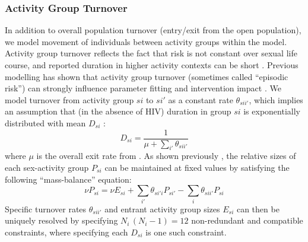 \subsubsection{Activity Group Turnover}\label{mod.par.turn.act}
In addition to overall population turnover (entry/exit from the open population),
we model movement of individuals between activity groups within the model.
Activity group turnover reflects the fact that risk is not constant over sexual life course,
and reported duration in higher activity contexts can be short \cite{Scorgie2012}.
Previous modelling has shown that activity group turnover (sometimes called ``episodic risk'')
can strongly influence parameter fitting and intervention impact \cite{Henry2015,Knight2020}.
We model turnover from activity group $si$ to $si'$ as a constant rate $\theta_{sii'}$,
which implies an assumption that (in the absence of HIV) duration in group $si$ is
exponentially distributed with mean $D_{si}$ \cite{Roberts2015}:
\begin{equation}\label{eq:model.par.dur}
  D_{si} = \frac{1}{\mu + \sum_{i'}\theta_{sii'}}
\end{equation}
where $\mu$ is the overall exit rate from .
As shown previously \cite{Knight2020}, the relative sizes of each sex-activity group $P_{si}$
can be maintained at fixed values by satisfying the following ``mass-balance'' equation:
\begin{equation}
  \nu P_{si} = \nu E_{si} + \sum_{i'} \theta_{si'i} P_{si'} - \sum_{i} \theta_{sii'} P_{si}
\end{equation}
Specific turnover rates $\theta_{sii'}$ and entrant activity group sizes $E_{si}$
can then be uniquely resolved by specifying
$N_i\,(N_i-1) = 12$ non-redundant and compatible constraints,
where specifying each $D_{si}$ is one such constraint.
